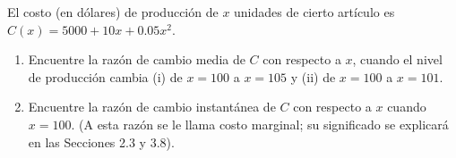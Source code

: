 \item El costo (en dólares) de producción de $x$ unidades de cierto artículo es $C(x) = 5000 + 10x + 0.05x^2$.
    \begin{enumerate}
        \item Encuentre la razón de cambio media de $C$ con respecto a $x$, cuando el nivel de producción cambia (i) de $x = 100$ a $x = 105$ y (ii) de $x = 100$ a $x = 101$.
        \item Encuentre la razón de cambio instantánea de $C$ con respecto a $x$ cuando $x = 100$. (A esta razón se le llama costo marginal; su significado se explicará en las Secciones 2.3 y 3.8).
    \end{enumerate}
